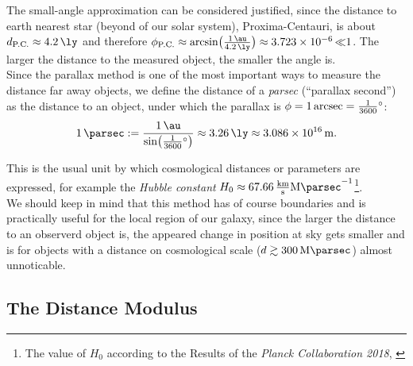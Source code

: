 The small-angle approximation can be considered justified, since the distance to earth nearest star (beyond of our solar system), Proxima-Centauri, is about $d_{\text{P.C.}} \approx \SI{4.2}{\ly}$ and therefore $\phi_{\text{P.C.}} \approx \arcsin \bigl( \frac{\SI{1}{\au}}{\SI{4.2}{\ly}} \bigr) \approx \SI{3.723e-6} \ll 1$.
The larger the distance to the measured object, the smaller the angle is. \\
\noindent Since the parallax method is one of the most important ways to measure the distance far away objects, we define the distance of a \textit{parsec} (``parallax second'') as the distance to an object, under which the parallax is $\phi = \SI{1}{\arcsec} = \frac{1}{3600} \SI{}{\degree}$:
\begin{align}
    \SI{1}{\parsec} := \frac{\SI{1}{\au}}{\sin \bigl( \frac{1}{3600} \SI{}{\degree} \bigr)} \approx \SI{3.26}{\ly} \approx \SI{3.086e16}{\meter}.
\end{align}

\noindent This is the usual unit by which cosmological distances or parameters are expressed, for example the \textit{Hubble constant} $H_{0} \approx \SI{67.66}{\frac{\kilo \meter}{\second} \mega \parsec^{-1}}$\footnote{The value of $H_{0}$ according to the Results of the \textit{Planck Collaboration 2018}, \cite[Table 7]{Planck2020} }. \\ 

\noindent We should keep in mind that this method has of course boundaries and is practically useful for the local region of our galaxy, since the larger the distance to an observerd object is, the appeared change in position at sky gets smaller and is for objects with a distance on cosmological scale ($d \gtrsim \SI{300}{\mega \parsec}$) almost unnoticable. 

\subsection{The Distance Modulus}

